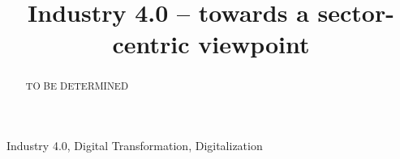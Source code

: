 


\title{Industry 4.0 – towards a sector-centric viewpoint}

\author{
	\and
}

\maketitle


\begin{abstract}%
TO BE DETERMINED
\end{abstract}

\begin{IEEEkeywords}
Industry 4.0, Digital Transformation, Digitalization
\end{IEEEkeywords}






\begingroup
\def\UrlBreaks{\do\/\do-}


\endgroup

